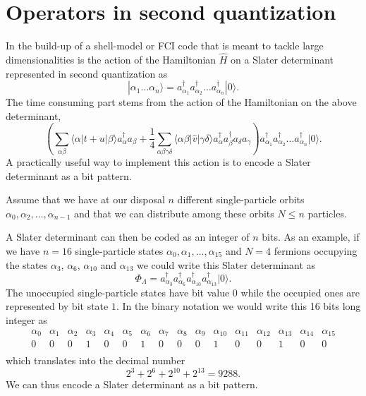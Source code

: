 \documentclass[graybox,sectrefs,envcountresetchap,open=right]{svmonodo}
\begin{document}
\section{Operators in second quantization}

In the build-up of a shell-model or FCI code that is meant to tackle large dimensionalities
is the action of the Hamiltonian $\hat{H}$ on a
Slater determinant represented in second quantization as
\[
 |\alpha_1\dots \alpha_n\rangle = a_{\alpha_1}^{\dagger} a_{\alpha_2}^{\dagger} \dots a_{\alpha_n}^{\dagger} |0\rangle.
\]
The time consuming part stems from the action of the Hamiltonian
on the above determinant,
\[
\left(\sum_{\alpha\beta} \langle \alpha|t+u|\beta\rangle a_\alpha^{\dagger} a_\beta + \frac{1}{4} \sum_{\alpha\beta\gamma\delta}
                \langle \alpha \beta|\hat{v}|\gamma \delta\rangle a_\alpha^{\dagger} a_\beta^{\dagger} a_\delta a_\gamma\right)a_{\alpha_1}^{\dagger} a_{\alpha_2}^{\dagger} \dots a_{\alpha_n}^{\dagger} |0\rangle.
\]
A practically useful way to implement this action is to encode a Slater determinant as a bit pattern.



Assume that we have at our disposal $n$ different single-particle orbits
$\alpha_0,\alpha_2,\dots,\alpha_{n-1}$ and that we can distribute  among these orbits $N\le n$ particles.

A Slater  determinant can then be coded as an integer of $n$ bits. As an example, if we have $n=16$ single-particle states
$\alpha_0,\alpha_1,\dots,\alpha_{15}$ and $N=4$ fermions occupying the states $\alpha_3$, $\alpha_6$, $\alpha_{10}$ and $\alpha_{13}$
we could write this Slater determinant as  
\[
\Phi_{\Lambda} = a_{\alpha_3}^{\dagger} a_{\alpha_6}^{\dagger} a_{\alpha_{10}}^{\dagger} a_{\alpha_{13}}^{\dagger} |0\rangle.
\]
The unoccupied single-particle states have bit value $0$ while the occupied ones are represented by bit state $1$. 
In the binary notation we would write this   16 bits long integer as
\[
\begin{array}{cccccccccccccccc}
{\alpha_0}&{\alpha_1}&{\alpha_2}&{\alpha_3}&{\alpha_4}&{\alpha_5}&{\alpha_6}&{\alpha_7} & {\alpha_8} &{\alpha_9} & {\alpha_{10}} &{\alpha_{11}} &{\alpha_{12}} &{\alpha_{13}} &{\alpha_{14}} & {\alpha_{15}} \\
{0} & {0} &{0} &{1} &{0} &{0} &{1} &{0} &{0} &{0} &{1} &{0} &{0} &{1} &{0} & {0} \\
\end{array}
\]
which translates into the decimal number
\[
2^3+2^6+2^{10}+2^{13}=9288.
\]
We can thus encode a Slater determinant as a bit pattern.
\end{document}
